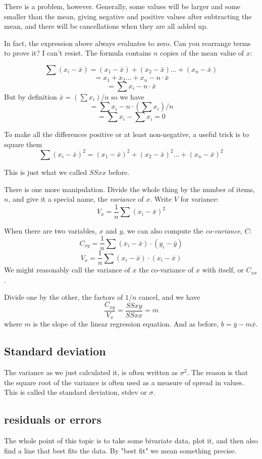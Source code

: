 \documentclass[11pt, oneside]{article}
\begin{document}
There is a problem, however.  Generally, some values will be  larger and some smaller than the mean, giving negative and positive values after subtracting the mean, and there will be cancellations when they are all added up.

In fact, the expression above always evaluates to zero.  Can you rearrange terms to prove it?  I can't resist.  The formula contains $n$ copies of the mean value of $x$:

\[ \sum (x_i - \bar{x}) = (x_1 - \bar{x}) + (x_2 - \bar{x}) \dots + (x_n - \bar{x}) \]
\[ = x_1 + x_2 \dots + x_n - n \cdot \bar{x} \]
\[ = \sum x_i - n \cdot \bar{x} \]
But by definition $\bar{x} = (\sum x_i)/n$ so we have
\[ = \sum x_i - n \cdot (\sum x_i)/n \]
\[ = \sum x_i - \sum x_i  = 0 \]

To make all the differences positive or at least non-negative, a useful trick is to square them
\[ \sum (x_i - \bar{x})^2 = (x_1 - \bar{x})^2 + (x_2 - \bar{x})^2 \dots + (x_n - \bar{x})^2  \]

This is just what we called $SSxx$ before.

There is one more manipulation.  Divide the whole thing by the number of items, $n$, and give it a special name, the \emph{variance} of $x$.  Write $V$ for variance:
\[ V_x = \frac{1}{n} \sum (x_i - \bar{x})^2 \]

When there are two variables, $x$ and $y$, we can also compute the \emph{co-variance}, $C$:
\[ C_{xy} = \frac{1}{n} \sum (x_i - \bar{x}) \cdot (y_i - \bar{y})  \]
\[ V_x = \frac{1}{n} \sum (x_i - \bar{x}) \cdot (x_i - \bar{x}) \]
We might reasonably call the variance of $x$ the co-variance of $x$ with itself, or $C_{xx}$.

Divide one by the other, the factors of $1/n$ cancel, and we have
\[ \frac{C_{xy}}{V_x} = \frac{SSxy}{SSxx} = m \]
where $m$ is the slope of the linear regression equation.  And as before, $b = \bar{y} - m \bar{x}$.

\subsection*{Standard deviation}

The variance as we just calculated it, is often written as $\sigma^2$.  The reason is that the square root of the variance is often used as a measure of spread in values.  This is called the standard deviation, stdev or $\sigma$.

\subsection*{residuals or errors}
The whole point of this topic is to take some bivariate data, plot it, and then also find a line that best fits the data.  By "best fit" we mean something precise.  
\end{document}

